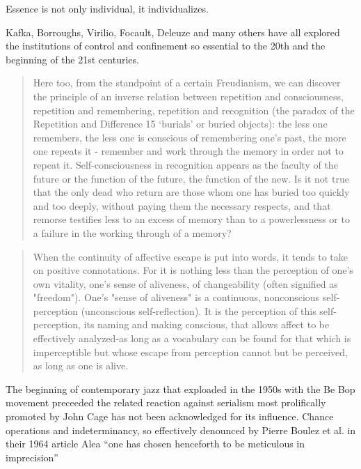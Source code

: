 \documentclass[a4paper]{article}
\begin{document}
\begin{quoatation}
  Essence is not only individual, it individualizes. \citep[p.43][]{deleuze72}
\end{quoatation}

Kafka, Borroughs, Virilio, Focault, Deleuze and many others have all explored the institutions of control and confinement so essential to the 20th and the beginning of the 21st centuries.

\begin{quotation}
Here too, from the standpoint of a certain Freudianism, we can discover the   principle of an inverse relation between repetition and consciousness,   repetition and remembering, repetition and recognition (the paradox of the   Repetition and Difference 15 ‘burials’ or buried objects): the less one   remembers, the less one is conscious of remembering one’s past, the more one   repeats it - remember and work through the memory in order not to repeat it.   Self-consciousness in recognition appears as the faculty of the future or   the function of the future, the function of the new.  Is it not true that   the only dead who return are those whom one has buried too quickly and too   deeply, without paying them the necessary respects, and that remorse   testifies less to an excess of memory than to a powerlessness or to a   failure in the working through of a memory? \citep[p. 14-5][]{deleuze94}
\end{quotation}

\begin{quotation}
  When the continuity of affective escape is put into words, it tends to take   on positive connotations. For it is nothing less than the perception of   one's own vitality, one's sense of aliveness, of changeability (often   signified as "freedom"). One's "sense of aliveness" is a continuous,   nonconscious self-perception (unconscious self-reflection). It is the   perception of this self-perception, its naming and making conscious, that   allows affect to be effectively analyzed-as long as a vocabulary can be   found for that which is imperceptible but whose escape from perception   cannot but be perceived, as long as one is alive. \citep{massumi95}
\end{quotation}

The beginning of contemporary jazz that exploaded in the 1950s with the Be Bop movement preceeded the related reaction against serialism most prolifically promoted by John Cage has not been acknowledged for its influence. Chance operations and indeterminancy, so effectively denounced by Pierre Boulez et al. in their 1964 article Alea \citep{boulez64} ``one has chosen henceforth to be meticulous in imprecision''
\end{document}
